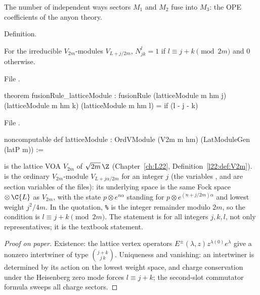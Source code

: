 \begin{physics}
The number of independent ways sectors $M_1$ and $M_2$ fuse into $M_3$: the OPE coefficients of the anyon theory.
\end{physics}

\begin{status}
Definition.
\end{status}

\begin{theorem}\label{l21:thm:latfusion}
For the irreducible $V_{2m}$-modules $V_{L+j/2m}$, $N_{jk}^l=1$ if $l\equiv j+k\pmod{2m}$ and $0$ otherwise.
\end{theorem}
\noindent File .
\begin{leancode}
theorem fusionRule_latticeModule :
    fusionRule (latticeModule m hm j) (latticeModule m hm k) (latticeModule m hm l)
      = if (l - j - k) %
\end{leancode}
\noindent File .
\begin{leancode}
noncomputable def latticeModule : OrdVModule (V2m m hm) (LatModuleGen (latP m)) :=
\end{leancode}

\begin{dictionary}
 is the lattice VOA $V_{2m}$ of $\sqrt{2m}\,\Z$ (Chapter~\ref{ch:L22}, Definition~\ref{l22:def:V2m}).
 is the ordinary $V_{2m}$-module $V_{L+j\alpha/2m}$ for an integer $j$ (the variables
,  and  are section variables of the files): its underlying space is the same
Fock space $\otimes\,\C\{L\}$ as $V_{2m}$, with the state $p\otimes e^{n\alpha}$ standing for
$p\otimes e^{(n+j/2m)\alpha}$ and lowest weight $j^2/4m$. In the quotation, \texttt{\%} is the integer remainder modulo $2m$, so the
condition is $l\equiv j+k\pmod{2m}$. The statement is for all integers $j,k,l$, not only representatives; it is the
textbook statement.
\end{dictionary}

\begin{proof}[Proof on paper]
Existence: the lattice vertex operators $E^\pm(\lambda,z)z^{\lambda(0)}e^\lambda$ give a nonzero intertwiner of type
$\binom{j+k}{j\ k}$. Uniqueness and vanishing: an intertwiner is determined by its action on the lowest weight space,
and charge conservation under the Heisenberg zero mode forces $l\equiv j+k$; the second-slot commutator formula sweeps
all charge sectors.
\end{proof}

